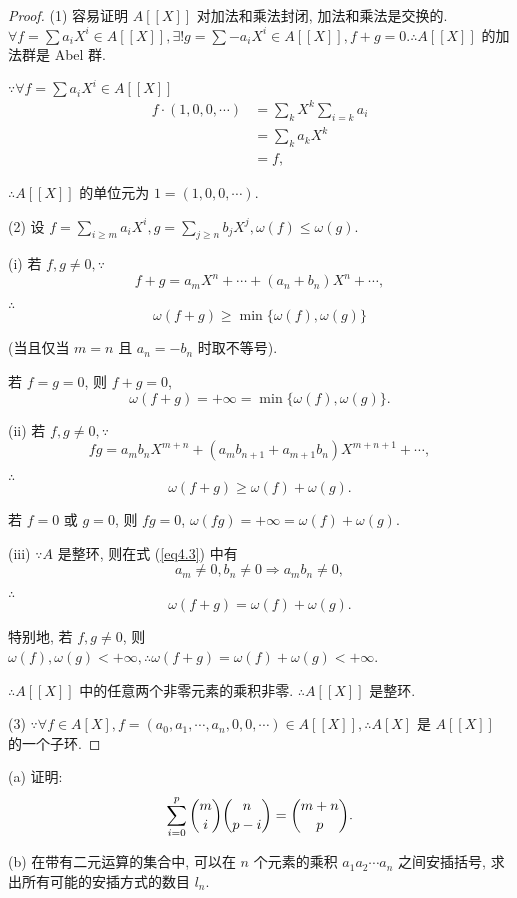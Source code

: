 \documentclass[UTF8]{ctexart}
\begin{document}
\begin{proof}
    (1) 容易证明 $A[[X]]$ 对加法和乘法封闭, 加法和乘法是交换的. $\forall f=\sum a_iX^i\in A[[X]],\exists! g=\sum-a_iX^i\in A[[X]],f+g=0.\therefore A[[X]]$ 的加法群是 Abel 群.

    $\because\forall f=\sum a_iX^i\in A[[X]]$
    \begin{align*}
        f\cdot(1,0,0,\cdots) & =\sum\limits_kX^k\sum\limits_{i=k}a_i \\
        & =\sum\limits_ka_kX^k \\
        & =f,
    \end{align*}

    $\therefore A[[X]]$ 的单位元为 $1=(1,0,0,\cdots)$.

    (2) 设 $f=\sum_{i\geq m}a_iX^i,g=\sum_{j\geq n}b_jX^j,\omega(f)\leq\omega(g)$.
    
    (i) 若 $f,g\neq0,\because$
    \[f+g=a_mX^n+\cdots+(a_n+b_n)X^n+\cdots,\]

    $\therefore$
    \[\omega(f+g)\geq\min\{\omega(f),\omega(g)\}\]

    (当且仅当 $m=n$ 且 $a_n=-b_n$ 时取不等号).

    若 $f=g=0$, 则 $f+g=0$,
    \[\omega(f+g)=+\infty=\min\{\omega(f),\omega(g)\}.\]

    (ii) 若 $f,g\neq0,\because$
    \begin{equation}\label{eq4.3}
        fg=a_mb_nX^{m+n}+(a_mb_{n+1}+a_{m+1}b_n)X^{m+n+1}+\cdots,
    \end{equation}

    $\therefore$
    \[\omega(f+g)\geq\omega(f)+\omega(g).\]

    若 $f=0$ 或 $g=0$, 则 $fg=0$, $\omega(fg)=+\infty=\omega(f)+\omega(g)$.

    (iii) $\because A$ 是整环, 则在式 (\ref{eq4.3}) 中有
    \[a_m\neq0,b_n\neq0\Rightarrow a_mb_n\neq0,\]

    $\therefore$
    \[\omega(f+g)=\omega(f)+\omega(g).\]

    特别地, 若 $f,g\neq0$, 则 $\omega(f),\omega(g)<+\infty,\therefore\omega(f+g)=\omega(f)+\omega(g)<+\infty$.

    $\therefore A[[X]]$ 中的任意两个非零元素的乘积非零. $\therefore A[[X]]$ 是整环.

    (3) $\because\forall f\in A[X],f=(a_0,a_1,\cdots,a_n,0,0,\cdots)\in A[[X]],\therefore A[X]$ 是 $A[[X]]$ 的一个子环.
\end{proof}
\begin{exercise}\label{ex2.6}
    (a) 证明:
    \[\sum\limits_{i=0}^p\dbinom{m}{i}\dbinom{n}{p-i}=\dbinom{m+n}{p}.\]

    (b) 在带有二元运算的集合中, 可以在 $n$ 个元素的乘积 $a_1a_2\cdots a_n$ 之间安插括号, 求出所有可能的安插方式的数目 $l_n$.
\end{exercise}
\end{document}
